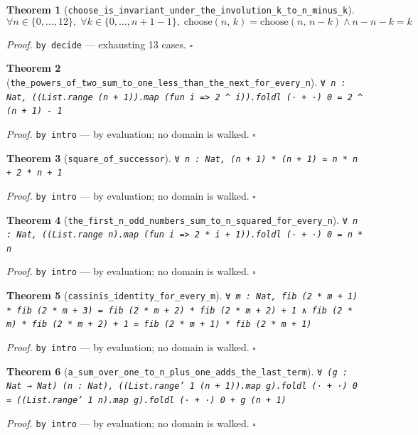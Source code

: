 \documentclass[11pt]{article}
\newtheorem{theorem}{Theorem}[section]
\begin{document}
\begin{theorem}[\texttt{choose\_is\_invariant\_under\_the\_involution\_k\_to\_n\_minus\_k}]
\[ \forall n \in \{0,\dots,12\},\; \forall k \in \{0,\dots,n + 1-1\},\; \mathrm{choose}\mathopen{}\left(n,\,k\right) = \mathrm{choose}\mathopen{}\left(n,\,n - k\right) \land n - n - k = k \]
\end{theorem}
\noindent\emph{Proof.} \texttt{by decide} --- exhausting 13 cases. \hfill$\square$

\begin{theorem}[\texttt{the\_powers\_of\_two\_sum\_to\_one\_less\_than\_the\_next\_for\_every\_n}]
\texttt{∀ n : Nat, ((List.range (n + 1)).map (fun i => 2 ^ i)).foldl (· + ·) 0 = 2 ^ (n + 1) - 1}
\end{theorem}
\noindent\emph{Proof.} \texttt{by
  intro} --- by evaluation; no domain is walked. \hfill$\square$

\begin{theorem}[\texttt{square\_of\_successor}]
\texttt{∀ n : Nat, (n + 1) * (n + 1) = n * n + 2 * n + 1}
\end{theorem}
\noindent\emph{Proof.} \texttt{by
  intro} --- by evaluation; no domain is walked. \hfill$\square$

\begin{theorem}[\texttt{the\_first\_n\_odd\_numbers\_sum\_to\_n\_squared\_for\_every\_n}]
\texttt{∀ n : Nat, ((List.range n).map (fun i => 2 * i + 1)).foldl (· + ·) 0 = n * n}
\end{theorem}
\noindent\emph{Proof.} \texttt{by
  intro} --- by evaluation; no domain is walked. \hfill$\square$

\begin{theorem}[\texttt{cassinis\_identity\_for\_every\_m}]
\texttt{∀ m : Nat, fib (2 * m + 1) * fib (2 * m + 3) = fib (2 * m + 2) * fib (2 * m + 2) + 1 ∧ fib (2 * m) * fib (2 * m + 2) + 1 = fib (2 * m + 1) * fib (2 * m + 1)}
\end{theorem}
\noindent\emph{Proof.} \texttt{by
  intro} --- by evaluation; no domain is walked. \hfill$\square$

\begin{theorem}[\texttt{a\_sum\_over\_one\_to\_n\_plus\_one\_adds\_the\_last\_term}]
\texttt{∀ (g : Nat → Nat) (n : Nat), ((List.range' 1 (n + 1)).map g).foldl (· + ·) 0 = ((List.range' 1 n).map g).foldl (· + ·) 0 + g (n + 1)}
\end{theorem}
\noindent\emph{Proof.} \texttt{by
  intro} --- by evaluation; no domain is walked. \hfill$\square$
\end{document}
